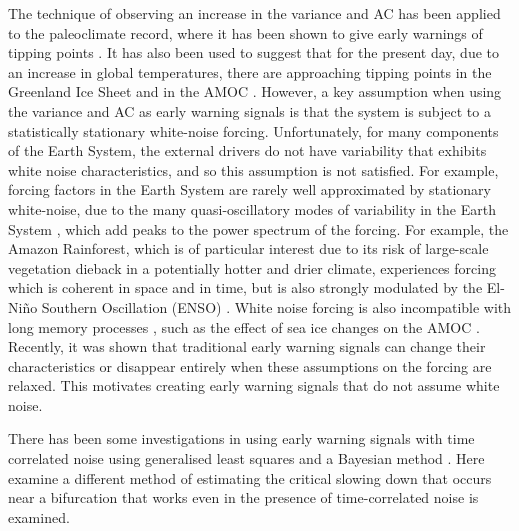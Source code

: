 The technique of observing an increase in the variance and
AC has been applied to the paleoclimate record, where it has been shown to give early
warnings of tipping points \parencite{Boers2018a}. It has also been used to 
suggest that for the present day, due to an increase in global temperatures, there are approaching tipping points in 
the Greenland Ice Sheet \parencite{Boers2021} and in the AMOC \parencite{Boers2021a}.	
However, a key assumption when using the variance and AC as early warning signals is that the system is subject to a statistically stationary white-noise forcing. Unfortunately, for many
components of the Earth System, the external drivers do not have variability that exhibits white noise characteristics, and
so this assumption is not satisfied. For example, forcing factors in the Earth System are rarely well approximated by stationary white-noise, due to the many quasi-oscillatory modes
of variability in the Earth System \parencite{VonderHeydt2021}, which add peaks
to the power spectrum of the forcing. For example, the Amazon
Rainforest, which is of particular interest due to its risk of large-scale vegetation dieback in a potentially hotter and drier
climate, experiences
forcing which is coherent in space and in time, but is also strongly modulated by the
El-Ni\~{n}o Southern Oscillation (ENSO) \parencite{Jimenez-Munoz2016}.
White noise forcing is also incompatible with
long memory processes \parencite{Hurst1957}, such as the effect of sea ice changes on the AMOC \parencite{Kuehn2021}. Recently, it was shown \parencite{Kuehn2021}
that traditional early warning signals  can change their characteristics or disappear entirely when these assumptions on the forcing are relaxed. This motivates creating early warning signals that do not assume white noise.


There has been some investigations in using early warning signals with time correlated noise using generalised least
squares \parencite{Boers2021a,Boettner2022} and a Bayesian method \parencite{hessler2022,Hessler2022b}. Here examine a different method of
estimating the critical slowing down that occurs near a bifurcation that works even in the presence of time-correlated noise is examined.

